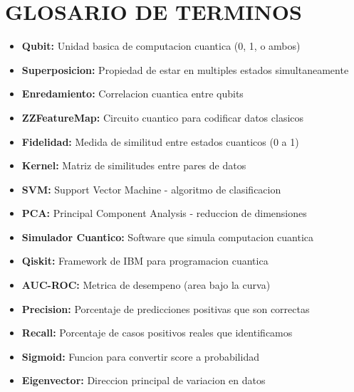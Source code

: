 \documentclass[11pt]{article}
\begin{document}
\section*{GLOSARIO DE TERMINOS}

\begin{itemize}
\item \textbf{Qubit:} Unidad basica de computacion cuantica (0, 1, o ambos)

\item \textbf{Superposicion:} Propiedad de estar en multiples estados simultaneamente

\item \textbf{Enredamiento:} Correlacion cuantica entre qubits

\item \textbf{ZZFeatureMap:} Circuito cuantico para codificar datos clasicos

\item \textbf{Fidelidad:} Medida de similitud entre estados cuanticos (0 a 1)

\item \textbf{Kernel:} Matriz de similitudes entre pares de datos

\item \textbf{SVM:} Support Vector Machine - algoritmo de clasificacion

\item \textbf{PCA:} Principal Component Analysis - reduccion de dimensiones

\item \textbf{Simulador Cuantico:} Software que simula computacion cuantica

\item \textbf{Qiskit:} Framework de IBM para programacion cuantica

\item \textbf{AUC-ROC:} Metrica de desempeno (area bajo la curva)

\item \textbf{Precision:} Porcentaje de predicciones positivas que son correctas

\item \textbf{Recall:} Porcentaje de casos positivos reales que identificamos

\item \textbf{Sigmoid:} Funcion para convertir score a probabilidad

\item \textbf{Eigenvector:} Direccion principal de variacion en datos

\end{itemize}
\end{document}
